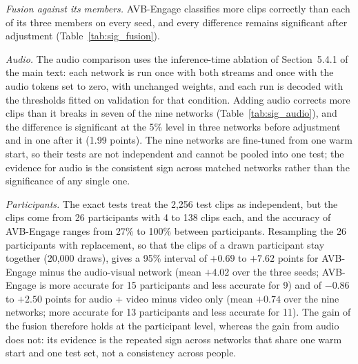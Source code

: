 \documentclass[pdflatex,sn-basic]{sn-jnl}
\newcommand{\ournet}{AVB-Engage}
\begin{document}
\emph{Fusion against its members.} \ournet{} classifies more clips correctly than each of its three members on every seed, and every difference remains significant after adjustment (Table~\ref{tab:sig_fusion}).

\emph{Audio.} The audio comparison uses the inference-time ablation of Section~5.4.1 of the main text: each network is run once with both streams and once with the audio tokens set to zero, with unchanged weights, and each run is decoded with the thresholds fitted on validation for that condition. Adding audio corrects more clips than it breaks in seven of the nine networks (Table~\ref{tab:sig_audio}), and the difference is significant at the 5\% level in three networks before adjustment and in one after it (1.99 points). The nine networks are fine-tuned from one warm start, so their tests are not independent and cannot be pooled into one test; the evidence for audio is the consistent sign across matched networks rather than the significance of any single one.

\emph{Participants.} The exact tests treat the 2,256 test clips as independent, but the clips come from 26 participants with 4 to 138 clips each, and the accuracy of \ournet{} ranges from 27\% to 100\% between participants. Resampling the 26 participants with replacement, so that the clips of a drawn participant stay together (20,000 draws), gives a 95\% interval of $+0.69$ to $+7.62$ points for \ournet{} minus the audio-visual network (mean $+4.02$ over the three seeds; \ournet{} is more accurate for 15 participants and less accurate for 9) and of $-0.86$ to $+2.50$ points for audio + video minus video only (mean $+0.74$ over the nine networks; more accurate for 13 participants and less accurate for 11). The gain of the fusion therefore holds at the participant level, whereas the gain from audio does not: its evidence is the repeated sign across networks that share one warm start and one test set, not a consistency across people.
\end{document}
